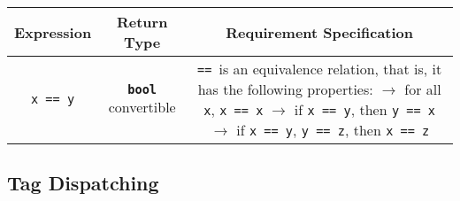     \begin{table}[h]
    \begin{tabular}{ccc}
        \toprule
        \bf{Expression} & \bf{Return Type} & \bf{Requirement Specification} \\
        \midrule
        \texttt{x == y} & \textbf{\texttt{bool}} convertible & \makecell[l]{\texttt{==}\, is an equivalence relation, that is,\\
                                                                it has the following properties:\\
                                                                $\rightarrow$ for all \texttt{x}, \texttt{x == x}\\
                                                                $\rightarrow$ if \texttt{x == y}, then \texttt{y == x}\\
                                                                $\rightarrow$ if \texttt{x == y}, \texttt{y == z}, then \texttt{x == z}} \\
        \bottomrule
    \end{tabular}
    \end{table}

    

    

    

    

    

\subsection{Tag Dispatching} \label{sec:tag_dispatching}

    

    

    
